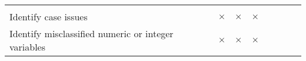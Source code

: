 \documentclass[]{article}
\begin{document}
\begin{longtable}[]{@{}lccccccc@{}}
\begin{minipage}[t]{0.06\columnwidth}
\strut
\end{minipage}\tabularnewline
\begin{minipage}[t]{0.33\columnwidth}\raggedright
Identify case issues\strut
\end{minipage} & \begin{minipage}[t]{0.07\columnwidth}\centering
\(\times\)\strut
\end{minipage} & \begin{minipage}[t]{0.07\columnwidth}\centering
\(\times\)\strut
\end{minipage} & \begin{minipage}[t]{0.07\columnwidth}\centering
\(\times\)\strut
\end{minipage} & \begin{minipage}[t]{0.07\columnwidth}\centering
\strut
\end{minipage} & \begin{minipage}[t]{0.07\columnwidth}\centering
\strut
\end{minipage} & \begin{minipage}[t]{0.06\columnwidth}\centering
\strut
\end{minipage} & \begin{minipage}[t]{0.06\columnwidth}\centering
\strut
\end{minipage}\tabularnewline
\begin{minipage}[t]{0.33\columnwidth}\raggedright
Identify misclassified numeric or integer variables\strut
\end{minipage} & \begin{minipage}[t]{0.07\columnwidth}\centering
\(\times\)\strut
\end{minipage} & \begin{minipage}[t]{0.07\columnwidth}\centering
\(\times\)\strut
\end{minipage} & \begin{minipage}[t]{0.07\columnwidth}\centering
\(\times\)\strut
\end{minipage} & \begin{minipage}[t]{0.07\columnwidth}\centering
\strut
\end{minipage} & \begin{minipage}[t]{0.07\columnwidth}\centering
\strut
\end{minipage} & \begin{minipage}[t]{0.06\columnwidth}\centering
\strut
\end{minipage} & \begin{minipage}[t]{0.06\columnwidth}\centering
\strut

\end{minipage}
\end{longtable}
\end{document}
